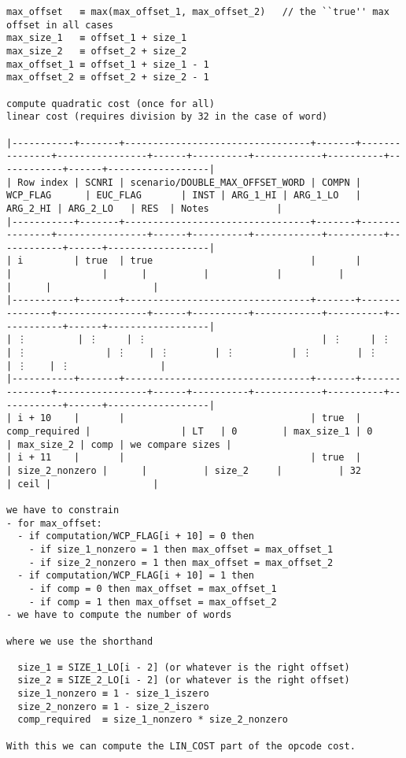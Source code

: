\documentclass[varwidth=\maxdimen,margin=0.5cm,multi={verbatim}]{standalone}
\begin{document}
\begin{verbatim}
max_offset   ≡ max(max_offset_1, max_offset_2)   // the ``true'' max offset in all cases
max_size_1   ≡ offset_1 + size_1
max_size_2   ≡ offset_2 + size_2
max_offset_1 ≡ offset_1 + size_1 - 1
max_offset_2 ≡ offset_2 + size_2 - 1

compute quadratic cost (once for all)
linear cost (requires division by 32 in the case of word)

|-----------+-------+---------------------------------+-------+---------------+----------------+------+----------+------------+----------+------------+------+------------------|
| Row index | SCNRI | scenario/DOUBLE_MAX_OFFSET_WORD | COMPN | WCP_FLAG      | EUC_FLAG       | INST | ARG_1_HI | ARG_1_LO   | ARG_2_HI | ARG_2_LO   | RES  | Notes            |
|-----------+-------+---------------------------------+-------+---------------+----------------+------+----------+------------+----------+------------+------+------------------|
| i         | true  | true                            |       |               |                |      |          |            |          |            |      |                  |
|-----------+-------+---------------------------------+-------+---------------+----------------+------+----------+------------+----------+------------+------+------------------|
| ⋮         | ⋮     | ⋮                               | ⋮     | ⋮             | ⋮              | ⋮    | ⋮        | ⋮          | ⋮        | ⋮          | ⋮    | ⋮                |
|-----------+-------+---------------------------------+-------+---------------+----------------+------+----------+------------+----------+------------+------+------------------|
| i + 10    |       |                                 | true  | comp_required |                | LT   | 0        | max_size_1 | 0        | max_size_2 | comp | we compare sizes |
| i + 11    |       |                                 | true  |               | size_2_nonzero |      |          | size_2     |          | 32         | ceil |                  |

we have to constrain
- for max_offset:
  - if computation/WCP_FLAG[i + 10] = 0 then
    - if size_1_nonzero = 1 then max_offset = max_offset_1
    - if size_2_nonzero = 1 then max_offset = max_offset_2
  - if computation/WCP_FLAG[i + 10] = 1 then
    - if comp = 0 then max_offset = max_offset_1
    - if comp = 1 then max_offset = max_offset_2
- we have to compute the number of words

where we use the shorthand

  size_1 ≡ SIZE_1_LO[i - 2] (or whatever is the right offset)
  size_2 ≡ SIZE_2_LO[i - 2] (or whatever is the right offset)
  size_1_nonzero ≡ 1 - size_1_iszero
  size_2_nonzero ≡ 1 - size_2_iszero
  comp_required  ≡ size_1_nonzero * size_2_nonzero

With this we can compute the LIN_COST part of the opcode cost.



\end{verbatim}
\end{document}
